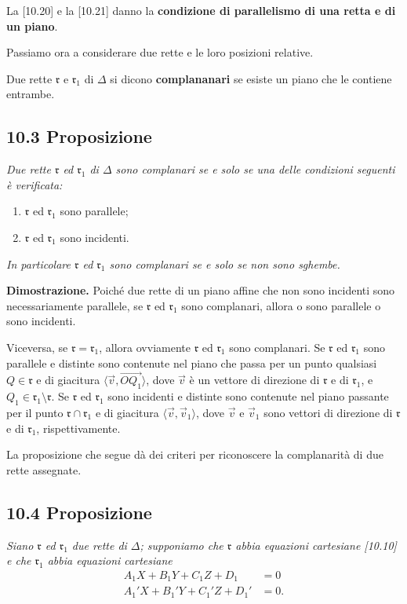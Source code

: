 \documentclass{article}
\theoremstyle{plain}
\theoremstyle{definition}
\theoremstyle{remark}
\begin{document}
La [10.20] e la [10.21] danno la \textbf{condizione di parallelismo di una retta e di un piano}.

Passiamo ora a considerare due rette e le loro posizioni relative.

Due rette $\mathfrak{r}$ e $\mathfrak{r}_1$ di $\Delta$ si dicono \textbf{complananari} se esiste un piano che le contiene entrambe.

\subsection*{10.3 Proposizione}
\textit{Due rette $\mathfrak{r}$ ed $\mathfrak{r}_1$ di $\Delta$ sono complanari se e solo se una delle condizioni seguenti è verificata:}
\begin{enumerate}
    \item $\mathfrak{r}$ ed $\mathfrak{r}_1$ sono parallele;
    \item $\mathfrak{r}$ ed $\mathfrak{r}_1$ sono incidenti.
\end{enumerate}
\textit{In particolare $\mathfrak{r}$ ed $\mathfrak{r}_1$ sono complanari se e solo se non sono sghembe.}

\textbf{Dimostrazione.}
Poiché due rette di un piano affine che non sono incidenti sono necessariamente parallele, se $\mathfrak{r}$ ed $\mathfrak{r}_1$ sono complanari, allora o sono parallele o sono incidenti.

Viceversa, se $\mathfrak{r} = \mathfrak{r}_1$, allora ovviamente $\mathfrak{r}$ ed $\mathfrak{r}_1$ sono complanari. Se $\mathfrak{r}$ ed $\mathfrak{r}_1$ sono parallele e distinte sono contenute nel piano che passa per un punto qualsiasi $Q \in \mathfrak{r}$ e di giacitura $\langle \vec{v}, \overrightarrow{OQ_1} \rangle$, dove $\vec{v}$ è un vettore di direzione di $\mathfrak{r}$ e di $\mathfrak{r}_1$, e $Q_1 \in \mathfrak{r}_1 \setminus \mathfrak{r}$. Se $\mathfrak{r}$ ed $\mathfrak{r}_1$ sono incidenti e distinte sono contenute nel piano passante per il punto $\mathfrak{r} \cap \mathfrak{r}_1$ e di giacitura $\langle \vec{v}, \vec{v}_1 \rangle$, dove $\vec{v}$ e $\vec{v}_1$ sono vettori di direzione di $\mathfrak{r}$ e di $\mathfrak{r}_1$, rispettivamente.

La proposizione che segue dà dei criteri per riconoscere la complanarità di due rette assegnate.

\subsection*{10.4 Proposizione}
\textit{Siano $\mathfrak{r}$ ed $\mathfrak{r}_1$ due rette di $\Delta$; supponiamo che $\mathfrak{r}$ abbia equazioni cartesiane [10.10] e che $\mathfrak{r}_1$ abbia equazioni cartesiane}
\begin{align*}
    A_1 X + B_1 Y + C_1 Z + D_1 &= 0 \\
    A_1' X + B_1' Y + C_1' Z + D_1' &= 0. \tag{10.27}
\end{align*}
\end{document}
